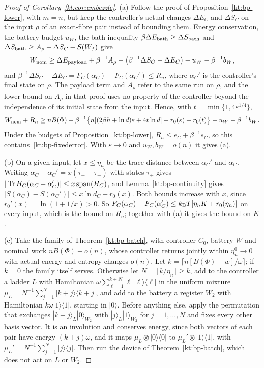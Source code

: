 \begin{proof}[Proof of Corollary~\ref{kt:cor:embezzle}]
(a) Follow the proof of Proposition~\ref{kt:bp-lower}, with $m=n$, but keep the controller's actual changes $\Delta E_C$ and $\Delta S_C$ on the input $\rho$ of an exact-fibre pair instead of bounding them. Energy conservation, the battery budget $u_W$, the bath inequality $\beta\Delta E_{\rm bath}\ge\Delta S_{\rm bath}$ and $\Delta S_{\rm bath}\ge A_\rho-\Delta S_C-S(W_f)$ give
\[
W_{\rm nom}\ge\Delta E_{\rm payload}+\beta^{-1}A_\rho-\bigl(\beta^{-1}\Delta S_C-\Delta E_C\bigr)-u_W-\beta^{-1}b_W,
\]
and $\beta^{-1}\Delta S_C-\Delta E_C=F_C(\alpha_C)-F_C(\alpha_C')\le R_n$, where $\alpha_C'$ is the controller's final state on $\rho$. The payload term and $A_\rho$ refer to the same run on $\rho$, and the lower bound on $A_\rho$ in that proof uses no property of the controller beyond the independence of its initial state from the input. Hence, with $t=\min\{1,4\varepsilon^{1/4}\}$,
\[
W_{\rm nom}+R_n\ge nB(\Phi)-\beta^{-1}\bigl\{n[(2\beta h+\ln d)\varepsilon+4t\ln d]+r_0(\varepsilon)+r_0(t)\bigr\}-u_W-\beta^{-1}b_W.
\]
Under the budgets of Proposition~\ref{kt:bp-lower}, $R_n\le e_C+\beta^{-1}s_C$, so this contains~\eqref{kt:bp-fixederror}. With $\varepsilon\to0$ and $u_W,b_W=o(n)$ it gives (a).

(b) On a given input, let $x\le\eta_n$ be the trace distance between $\alpha_C'$ and $\alpha_C$. Writing $\alpha_C-\alpha_C'=x(\tau_+-\tau_-)$ with states $\tau_\pm$ gives $|\operatorname{Tr} H_C(\alpha_C-\alpha_C')|\le x\,\mathrm{span}(H_C)$, and Lemma~\ref{kt:bp-continuity} gives $|S(\alpha_C)-S(\alpha_C')|\le x\ln d_C+r_0(x)$. Both bounds increase with $x$, since $r_0'(x)=\ln(1+1/x)>0$. So $F_C(\alpha_C)-F_C(\alpha_C')\le k_{\mathrm B} T[\eta_nK+r_0(\eta_n)]$ on every input, which is the bound on $R_n$; together with (a) it gives the bound on $K$.

(c) Take the family of Theorem~\ref{kt:bp-batch}, with controller $C_0$, battery $W$ and nominal work $nB(\Phi)+o(n)$, whose controller returns jointly within $\eta^0_n\to0$ with actual energy and entropy changes $o(n)$. Let $k=\lceil n[B(\Phi)-w]/\omega\rceil$; if $k=0$ the family itself serves. Otherwise let $N=\lceil k/\eta_n\rceil\ge k$, add to the controller a ladder $L$ with Hamiltonian $\omega\sum_{\ell=1}^{k+N}\ell\,|\ell\rangle\langle\ell|$ in the uniform mixture $\mu_L=N^{-1}\sum_{j=1}^N|k+j\rangle\langle k+j|$, and add to the battery a register $W_2$ with Hamiltonian $k\omega|1\rangle\langle1|$, starting in $|0\rangle$. Before anything else, apply the permutation that exchanges $|k+j\rangle_L|0\rangle_{W_2}$ with $|j\rangle_L|1\rangle_{W_2}$ for $j=1,\dots,N$ and fixes every other basis vector. It is an involution and conserves energy, since both vectors of each pair have energy $(k+j)\omega$, and it maps $\mu_L\otimes|0\rangle\langle0|$ to $\mu_L'\otimes|1\rangle\langle1|$, with $\mu_L'=N^{-1}\sum_{j=1}^N|j\rangle\langle j|$. Then run the device of Theorem~\ref{kt:bp-batch}, which does not act on $L$ or $W_2$.


\end{proof}
